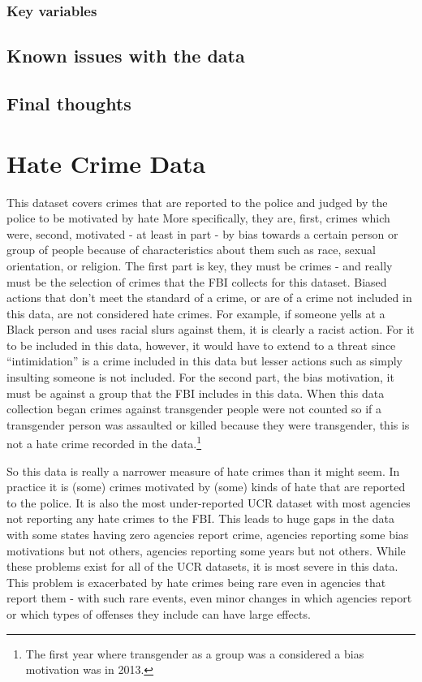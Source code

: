 \documentclass[
  12pt,
  openany]{book}
\begin{document}
\hypertarget{key-variables-2}{%
\subsection{Key variables}\label{key-variables-2}}

\hypertarget{known-issues-with-the-data-2}{%
\section{Known issues with the data}\label{known-issues-with-the-data-2}}

\hypertarget{final-thoughts-2}{%
\section{Final thoughts}\label{final-thoughts-2}}

\hypertarget{hate_crimes}{%
\chapter{Hate Crime Data}\label{hate_crimes}}

This dataset covers crimes that are reported to the police and judged by the police to be motivated by hate More specifically, they are, first, crimes which were, second, motivated - at least in part - by bias towards a certain person or group of people because of characteristics about them such as race, sexual orientation, or religion. The first part is key, they must be crimes - and really must be the selection of crimes that the FBI collects for this dataset. Biased actions that don't meet the standard of a crime, or are of a crime not included in this data, are not considered hate crimes. For example, if someone yells at a Black person and uses racial slurs against them, it is clearly a racist action. For it to be included in this data, however, it would have to extend to a threat since ``intimidation'' is a crime included in this data but lesser actions such as simply insulting someone is not included. For the second part, the bias motivation, it must be against a group that the FBI includes in this data. When this data collection began crimes against transgender people were not counted so if a transgender person was assaulted or killed because they were transgender, this is not a hate crime recorded in the data.\footnote{The first year where transgender as a group was a considered a bias motivation was in 2013.}

So this data is really a narrower measure of hate crimes than it might seem. In practice it is (some) crimes motivated by (some) kinds of hate that are reported to the police. It is also the most under-reported UCR dataset with most agencies not reporting any hate crimes to the FBI. This leads to huge gaps in the data with some states having zero agencies report crime, agencies reporting some bias motivations but not others, agencies reporting some years but not others. While these problems exist for all of the UCR datasets, it is most severe in this data. This problem is exacerbated by hate crimes being rare even in agencies that report them - with such rare events, even minor changes in which agencies report or which types of offenses they include can have large effects.
\end{document}
